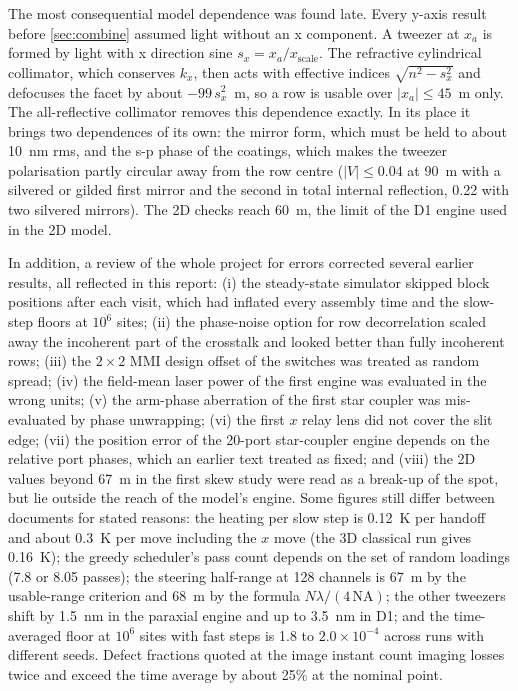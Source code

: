 The most consequential model dependence was found late. Every y-axis result before \cref{sec:combine} assumed
light without an x component. A tweezer at $x_a$ is formed by light with x direction sine $s_x = x_a/x_\mathrm{scale}$.
The refractive cylindrical collimator, which conserves $k_x$, then acts with effective indices $\sqrt{n^2-s_x^2}$
and defocuses the facet by about $-99\,s_x^2$~\textmu m, so a row is usable over $|x_a|\leq 45$~\textmu m only. The
all-reflective collimator removes this dependence exactly. In its place it brings two dependences of its own: the
mirror form, which must be held to about 10~nm rms, and the s-p phase of the coatings, which makes the tweezer
polarisation partly circular away from the row centre ($|V|\leq0.04$ at 90~\textmu m with a silvered or gilded
first mirror and the second in total internal reflection, 0.22 with two silvered mirrors). The 2D checks reach
60~\textmu m, the limit of the D1 engine used in the 2D model.

In addition, a review of the whole project for errors corrected several earlier results, all reflected in this
report: (i) the steady-state simulator skipped block positions after each visit, which had inflated every
assembly time and the slow-step floors at $10^6$ sites; (ii) the phase-noise option for row decorrelation
scaled away the incoherent part of the crosstalk and looked better than fully incoherent rows; (iii) the
$2\times2$ MMI design offset of the switches was treated as random spread; (iv) the field-mean laser power of
the first engine was evaluated in the wrong units; (v) the arm-phase aberration of the first star coupler was
mis-evaluated by phase unwrapping; (vi) the first $x$ relay lens did not cover the slit edge; (vii) the
position error of the 20-port star-coupler engine depends on the relative port phases, which an earlier text
treated as fixed; and (viii) the 2D values beyond 67~\textmu m in the first skew study were read as a break-up of the
spot, but lie outside the reach of the model's engine. Some figures still differ between documents for stated reasons: the heating per slow step is
0.12~\textmu K per handoff and about 0.3~\textmu K per move including the $x$ move (the 3D classical run gives
0.16~\textmu K); the greedy scheduler's pass count depends on the set of random loadings (7.8 or 8.05 passes);
the steering half-range at 128 channels is 67~\textmu m by the usable-range criterion and 68~\textmu m by the
formula $N\lambda/(4\,\mathrm{NA})$; the other tweezers shift by 1.5~nm in the paraxial engine and up to 3.5~nm in
D1; and the time-averaged floor at $10^6$ sites with fast steps is 1.8 to $2.0\times10^{-4}$ across runs with
different seeds. Defect fractions quoted at the image instant count imaging losses twice and exceed the time
average by about 25\% at the nominal point.

